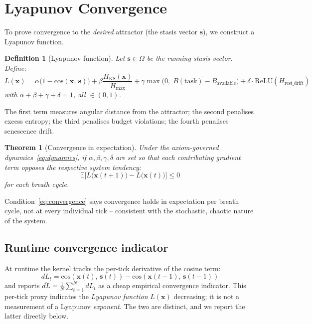 \documentclass[11pt, a4paper]{article}
\newtheorem{theorem}{Theorem}
\newtheorem{definition}{Definition}
\newcommand{\E}{\mathbb{E}}
\newcommand{\stasis}{\bm{s}}
\newcommand{\sv}{\bm{x}}
\newcommand{\cosim}[2]{\mathrm{cos}\!\left(#1,\, #2\right)}
\begin{document}
\section{Lyapunov Convergence}
\label{sec:lyapunov}

To prove convergence to the \emph{desired} attractor (the stasis vector
$\stasis$), we construct a Lyapunov function.

\begin{definition}[Lyapunov function]
\label{def:lyapunov}
Let $\stasis \in \Omega$ be the running stasis vector.
Define:
\begin{equation}
  L(\sv) = \alpha \bigl(1 - \cosim{\sv}{\stasis}\bigr)
          + \beta \frac{H_\text{KS}(\sv)}{H_\text{max}}
          + \gamma \max\!\bigl(0,\; B(\text{task}) - B_\text{available}\bigr)
          + \delta \cdot \mathrm{ReLU}(H_\text{rest\_drift})
\label{eq:lyapunov}
\end{equation}
with $\alpha + \beta + \gamma + \delta = 1$, all $\in (0,1)$.
\end{definition}

The first term measures angular distance from the attractor;
the second penalises excess entropy; the third penalises budget violations;
the fourth penalises senescence drift.

\begin{theorem}[Convergence in expectation]
\label{thm:convergence}
Under the axiom-governed dynamics~\eqref{eq:dynamics},
if $\alpha, \beta, \gamma, \delta$ are set so that each contributing
gradient term opposes the respective system tendency:
\begin{equation}
  \E\bigl[L\bigl(\sv(t+1)\bigr) - L\bigl(\sv(t)\bigr)\bigr] \le 0
\label{eq:convergence}
\end{equation}
for each breath cycle.
\end{theorem}

Condition~\eqref{eq:convergence} says convergence holds in expectation per
breath cycle, not at every individual tick -- consistent with the stochastic,
chaotic nature of the system.

\subsection*{Runtime convergence indicator}

At runtime the kernel tracks the per-tick derivative of the cosine term:
\begin{equation}
  dL_t = \cosim{\sv(t)}{\stasis(t)} - \cosim{\sv(t-1)}{\stasis(t-1)}
\end{equation}
and reports $\overline{dL} = \frac{1}{N}\sum_{t=1}^{N} dL_t$
as a cheap empirical convergence indicator.
This per-tick proxy indicates the \emph{Lyapunov function} $L(\sv)$
decreasing; it is not a measurement of a Lyapunov \emph{exponent}.
The two are distinct, and we report the latter directly below.
\end{document}
